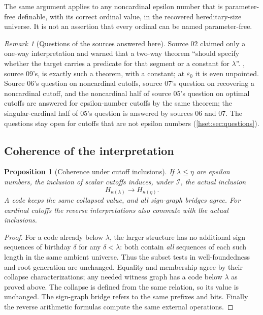 \documentclass[11pt,letterpaper]{article}
\newtheorem{proposition}[proposition]{Proposition}\aliascntresetthe{proposition}
\theoremstyle{definition}
\theoremstyle{remark}
\newtheorem{remark}[remark]{Remark}\aliascntresetthe{remark}
\newcommand{\I}{\mathcal I}
\begin{document}
The same argument applies to any noncardinal epsilon number that is
parameter-free definable, with its correct ordinal value, in the recovered
hereditary-size universe. It is not an assertion that every ordinal can be
named parameter-free.

\begin{remark}[Questions of the sources answered here]\label{hset:rem:answered-bi}
Source 02 claimed only a one-way interpretation and warned that a two-way
theorem ``should specify whether the target carries a predicate for that
segment or a constant for $\lambda$''. , source
09's, is exactly such a theorem, with a constant; at $\varepsilon_0$ it is even
unpointed. Source 06's question on noncardinal cutoffs, source 07's question on
recovering a noncardinal cutoff, and the noncardinal half of source 05's
question on optimal cutoffs are answered for epsilon-number cutoffs by the same
theorem; the singular-cardinal half of 05's question is answered by sources 06
and 07. The questions stay open for cutoffs that are not epsilon numbers
(\cref{hset:sec:questions}).
\end{remark}

\subsection{Coherence of the interpretation}

\begin{proposition}[Coherence under cutoff inclusions]
\label{hset:prop:coherence}
If $\lambda\le\eta$ are epsilon numbers, the inclusion of scalar cutoffs
induces, under $\I$, the actual inclusion
\[
 H_{\kappa(\lambda)}\longrightarrow H_{\kappa(\eta)}.
\]
A code keeps the same collapsed value, and all sign-graph bridges agree.
For cardinal cutoffs the reverse interpretations also commute with the
actual inclusions.
\end{proposition}
\begin{proof}
For a code already below $\lambda$, the larger structure has no additional
sign sequences of birthday $\delta$ for any $\delta<\lambda$: both contain
\emph{all} sequences of each such length in the same ambient universe.
Thus the subset tests in well-foundedness and root generation are unchanged.
Equality and membership agree by their collapse characterizations; any
needed witness graph has a code below $\lambda$ as proved above. The
collapse is defined from the same relation, so its value is unchanged.
The sign-graph bridge refers to the same prefixes and bits. Finally the
reverse arithmetic formulas compute the same external operations.
\end{proof}
\end{document}

